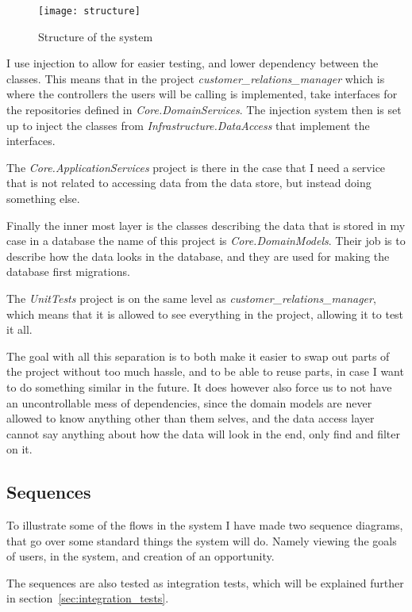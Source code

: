 \begin{figure}[h]
  \centering
  \texttt{[image: structure]}
  \caption{Structure of the system}
  \label{fig:structure}
\end{figure}

I use injection to allow for easier testing, and lower dependency between the
classes. This means that in the project \textit{customer\_relations\_manager}
which is where the controllers the users will be calling is implemented, take
interfaces for the repositories defined in \textit{Core.DomainServices}. The
injection system then is set up to inject the classes from
\textit{Infrastructure.DataAccess} that implement the interfaces. 

The \textit{Core.ApplicationServices} project is there in the case that I need a
service that is not related to accessing data from the data store, but instead
doing something else. 

Finally the inner most layer is the classes describing the data that is stored
in my case in a database the name of this project is \textit{Core.DomainModels}.
Their job is to describe how the data looks in the database, and they are used
for making the database first migrations. 

The \textit{UnitTests} project is on the same level as
\textit{customer\_relations\_manager}, which means that it is allowed to see
everything in the project, allowing it to test it all. 

The goal with all this separation is to both make it easier to swap out parts of
the project without too much hassle, and to be able to reuse parts, in case I
want to do something similar in the future. It does however also force us to not
have an uncontrollable mess of dependencies, since the domain models are never
allowed to know anything other than them selves, and the data access layer
cannot say anything about how the data will look in the end, only find and
filter on it. 

\subsection{Sequences}
\label{subsec:sequences}
To illustrate some of the flows in the system I have made two sequence diagrams,
that go over some standard things the system will do. Namely viewing the goals
of users, in the system, and creation of an opportunity.

The sequences are also tested as integration tests, which will be explained
further in section~\ref{sec:integration_tests}.


